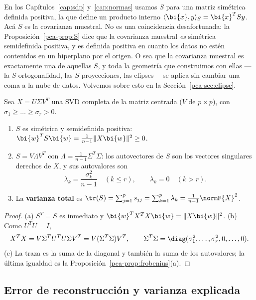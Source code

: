 \begin{remark}[La letra $S$]\label{pca-obs:letra-S}
En los Capítulos~\ref{cap:sdp} y~\ref{cap:normas} usamos $S$ para una
matriz simétrica definida positiva, la que define un producto interno
$\langle \bi{x},y\rangle_S=\bi{x}^TSy$. Acá $S$ es la covarianza muestral. No es una
coincidencia desafortunada: la Proposición~\ref{pca-prop:S} dice que la
covarianza muestral \emph{es} simétrica semidefinida positiva, y es definida
positiva en cuanto los datos no estén contenidos en un hiperplano por el
origen. O sea que la covarianza muestral es exactamente una de aquellas $S$, y
toda la geometría que construimos con ellas ---la $S$-ortogonalidad, las
$S$-proyecciones, las elipses--- se aplica sin cambiar una coma a la nube de
datos. Volvemos sobre esto en la Sección~\ref{pca-sec:elipse}.
\end{remark}

\begin{proposition}[Propiedades de $S$]\label{pca-prop:S}
Sea $X=U\Sigma V^T$ una SVD completa de la matriz centrada ($V$ de
$p\times p$), con $\sigma_1\ge\dots\ge\sigma_r>0$.
\begin{enumerate}[label=(\alph*),leftmargin=*]
\item $S$ es simétrica y semidefinida positiva: $\bi{w}^T S\bi{w}=\frac1{n-1}\|X\bi{w}\|^2\ge0$.
\item $S=V\Lambda V^T$ con $\Lambda=\frac{1}{n-1}\Sigma^T\Sigma$: los
autovectores de $S$ son los vectores singulares derechos de $X$, y sus
autovalores son
\[
\lambda_k=\frac{\sigma_k^2}{n-1}\quad(k\le r),\qquad \lambda_k=0\quad(k>r).
\]
\item La \textbf{varianza total} es
$\tr(S)=\sum_{j=1}^ps_{jj}=\sum_{k=1}^p\lambda_k=\frac{1}{n-1}\normF{X}^2$.
\end{enumerate}
\end{proposition}

\begin{proof}
(a) $S^T=S$ es inmediato y $\bi{w}^T X^T X\bi{w}=\|X\bi{w}\|^2$.
(b) Como $U^T U=I$,
\[
X^T X=V\Sigma^T U^T U\Sigma V^T=V(\Sigma^T\Sigma)V^T,
\qquad \Sigma^T\Sigma=\diag(\sigma_1^2,\dots,\sigma_r^2,0,\dots,0).
\]
(c) La traza es la suma de la diagonal y también la suma de los autovalores;
la última igualdad es la Proposición~\ref{pca-prop:frobenius}(a).
\end{proof}

\subsection{Error de reconstrucción y varianza explicada}

